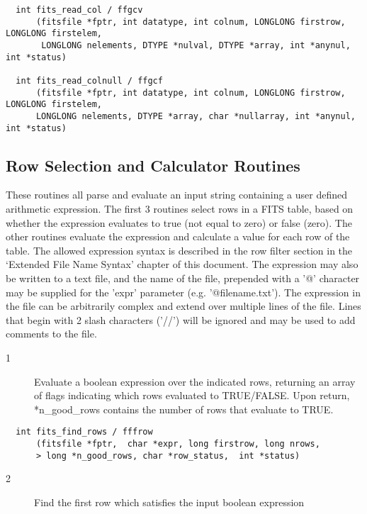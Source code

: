 \documentclass[11pt]{book}
\begin{document}
\begin{verbatim}
  int fits_read_col / ffgcv
      (fitsfile *fptr, int datatype, int colnum, LONGLONG firstrow, LONGLONG firstelem,
       LONGLONG nelements, DTYPE *nulval, DTYPE *array, int *anynul, int *status)

  int fits_read_colnull / ffgcf
      (fitsfile *fptr, int datatype, int colnum, LONGLONG firstrow, LONGLONG firstelem,
      LONGLONG nelements, DTYPE *array, char *nullarray, int *anynul, int *status)
\end{verbatim}


\subsection{Row Selection and Calculator Routines}

These routines all parse and evaluate an input string containing a user
defined arithmetic expression.  The first 3 routines select rows in a
FITS table, based on whether the expression evaluates to true (not
equal to zero) or false (zero).  The other routines evaluate the
expression and calculate a value for each row of the table.  The
allowed expression syntax is described in the row filter section in the
`Extended File Name Syntax' chapter of this document.  The expression
may also be written to a text file, and the name of the file, prepended
with a '@' character may be supplied for the 'expr' parameter (e.g.
'@filename.txt'). The  expression  in  the  file can be arbitrarily
complex and extend over multiple lines of the file.  Lines  that begin
with 2 slash characters ('//') will  be ignored and may be used to add
comments to the file.


\begin{description}
\item[1 ] Evaluate a boolean expression over the indicated rows, returning an
 array of flags indicating which rows evaluated to TRUE/FALSE.
 Upon return,
 *n\_good\_rows contains the number of rows that evaluate to TRUE. \label{fffrow}
\end{description}

\begin{verbatim}
  int fits_find_rows / fffrow
      (fitsfile *fptr,  char *expr, long firstrow, long nrows,
      > long *n_good_rows, char *row_status,  int *status)
\end{verbatim}

\begin{description}
\item[2 ] Find the first row which satisfies the input boolean expression \label{ffffrw}
\end{description}
\end{document}
